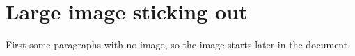 \documentclass{article}
\begin{document}
\section*{Large image sticking out}

\noindent First some paragraphs with no image, so the image starts
later in the document.

\lipsum[1-2]

\lipsum[3-8]
\end{document}
